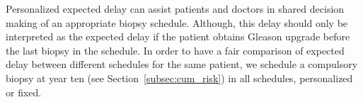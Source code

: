 Personalized expected delay can assist patients and doctors in shared decision making of an appropriate biopsy schedule. Although, this delay should only be interpreted as the expected delay if the patient obtains Gleason upgrade before the last biopsy in the schedule. In order to have a fair comparison of expected delay between different schedules for the same patient, we schedule a compulsory biopsy at year ten (see Section~\ref{subsec:cum_risk}) in all schedules, personalized or fixed.